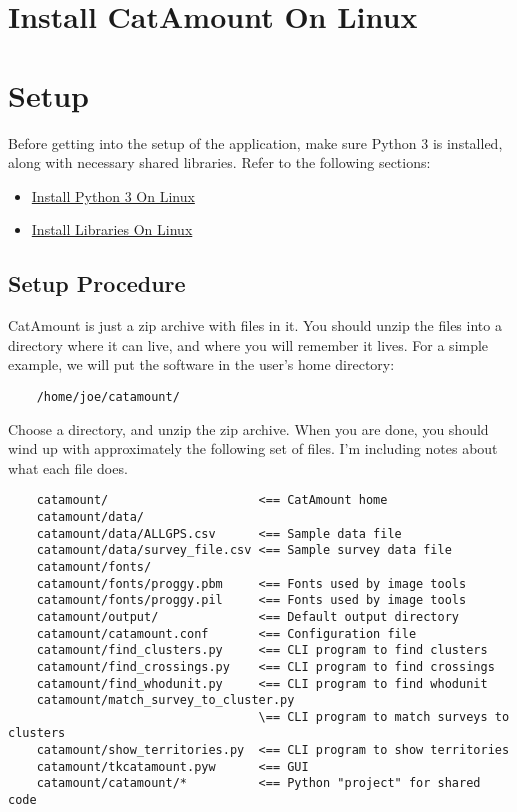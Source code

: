 \chapter{Install CatAmount On Linux}
\hypertarget{linux-install-catamount}{}

\chapter{Setup}
\hypertarget{setup}{}

Before getting into the setup of the application, make sure Python 3
is installed, along with necessary shared libraries. Refer to the
following sections:

\begin{itemize}
\item \hyperlink{linux-install-python}{Install Python 3 On Linux}
\item \hyperlink{linux-install-libraries}{Install Libraries On Linux}
\end{itemize}

\section{Setup Procedure}

CatAmount is just a zip archive with files in it. You should unzip
the files into a directory where it can live, and where you will
remember it lives. For a simple example, we will put the software
in the user's home directory:

\begin{verbatim}
    /home/joe/catamount/
\end{verbatim}

Choose a directory, and unzip the zip archive. When you are done,
you should wind up with approximately the following set of files.
I'm including notes about what each file does.

\begin{verbatim}
    catamount/                     <== CatAmount home
    catamount/data/
    catamount/data/ALLGPS.csv      <== Sample data file
    catamount/data/survey_file.csv <== Sample survey data file
    catamount/fonts/
    catamount/fonts/proggy.pbm     <== Fonts used by image tools
    catamount/fonts/proggy.pil     <== Fonts used by image tools
    catamount/output/              <== Default output directory
    catamount/catamount.conf       <== Configuration file
    catamount/find_clusters.py     <== CLI program to find clusters
    catamount/find_crossings.py    <== CLI program to find crossings
    catamount/find_whodunit.py     <== CLI program to find whodunit
    catamount/match_survey_to_cluster.py
                                   \== CLI program to match surveys to clusters
    catamount/show_territories.py  <== CLI program to show territories
    catamount/tkcatamount.pyw      <== GUI
    catamount/catamount/*          <== Python "project" for shared code
\end{verbatim}

